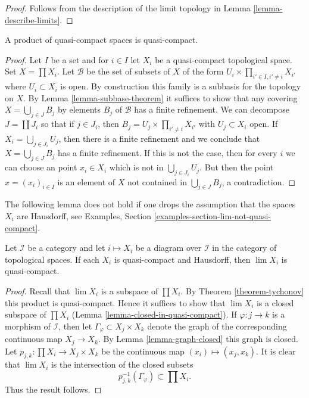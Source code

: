 \begin{proof}
Follows from the description of the limit topology
in Lemma \ref{lemma-describe-limits}.
\end{proof}

\begin{theorem}[Tychonov]
\label{theorem-tychonov}
A product of quasi-compact spaces is quasi-compact.
\end{theorem}

\begin{proof}
Let $I$ be a set and for $i \in I$ let $X_i$ be a quasi-compact topological
space. Set $X = \prod X_i$. Let $\mathcal{B}$ be the set of subsets of $X$
of the form $U_i \times \prod_{i' \in I, i' \not = i} X_{i'}$ where
$U_i \subset X_i$ is open. By construction this family is a subbasis
for the topology on $X$. By Lemma \ref{lemma-subbase-theorem} it
suffices to show that any covering $X = \bigcup_{j \in J} B_j$
by elements $B_j$ of $\mathcal{B}$ has a finite refinement.
We can decompose $J = \coprod J_i$ so that if $j \in J_i$, then
$B_j = U_j \times \prod_{i' \not = i} X_{i'}$ with $U_j \subset X_i$
open. If $X_i = \bigcup_{j \in J_i} U_j$, then there is a finite
refinement and we conclude that $X = \bigcup_{j \in J} B_j$
has a finite refinement. If this is not the case, then for every $i$
we can choose an point $x_i \in X_i$ which is not in
$\bigcup_{j \in J_i} U_j$. But then the point $x = (x_i)_{i \in I}$
is an element of $X$ not contained in $\bigcup_{j \in J} B_j$, a
contradiction.
\end{proof}

\noindent
The following lemma does not hold if one drops the assumption that
the spaces $X_i$ are Hausdorff, see
Examples, Section \ref{examples-section-lim-not-quasi-compact}.

\begin{lemma}
\label{lemma-inverse-limit-quasi-compact}
Let $\mathcal{I}$ be a category and let $i \mapsto X_i$
be a diagram over $\mathcal{I}$ in the category of topological
spaces. If each $X_i$ is quasi-compact and Hausdorff, then
$\lim X_i$ is quasi-compact.
\end{lemma}

\begin{proof}
Recall that $\lim X_i$ is a subspace of $\prod X_i$. By
Theorem \ref{theorem-tychonov} this product is quasi-compact. Hence it
suffices to show that $\lim X_i$ is a closed subspace of $\prod X_i$
(Lemma \ref{lemma-closed-in-quasi-compact}).
If $\varphi : j \to k$ is a morphism of $\mathcal{I}$, then
let $\Gamma_\varphi \subset X_j \times X_k$ denote the graph
of the corresponding continuous map $X_j \to X_k$. By
Lemma \ref{lemma-graph-closed} this graph is closed.
Let $p_{j,k} : \prod X_i \to X_j \times X_k$ be the continuous map
$(x_i) \mapsto (x_j, x_k)$. It is clear that $\lim X_i$ is the
intersection of the closed subsets
$$
p_{j,k}^{-1}(\Gamma_\varphi) \subset \prod X_i.
$$
Thus the result follows.
\end{proof}

